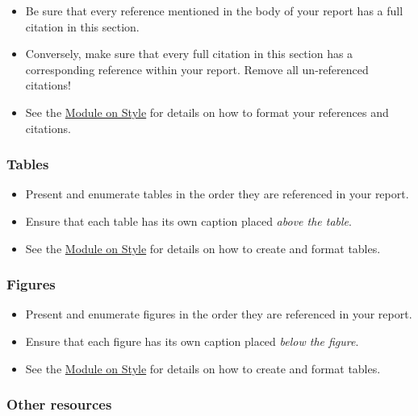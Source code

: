 \documentclass[
]{book}
\begin{document}
\begin{itemize}
\item
  Be sure that every reference mentioned in the body of your report has a full citation in this section.
\item
  Conversely, make sure that every full citation in this section has a corresponding reference within your report. Remove all un-referenced citations!
\item
  See the \protect\hyperlink{style}{Module on Style} for details on how to format your references and citations.
\end{itemize}

\hypertarget{tables-1}{%
\subsubsection*{Tables}\label{tables-1}}

\begin{itemize}
\item
  Present and enumerate tables in the order they are referenced in your report.
\item
  Ensure that each table has its own caption placed \emph{above the table}.
\item
  See the \protect\hyperlink{style}{Module on Style} for details on how to create and format tables.
\end{itemize}

\hypertarget{figures-1}{%
\subsubsection*{Figures}\label{figures-1}}

\begin{itemize}
\item
  Present and enumerate figures in the order they are referenced in your report.
\item
  Ensure that each figure has its own caption placed \emph{below the figure}.
\item
  See the \protect\hyperlink{style}{Module on Style} for details on how to create and format tables.
\end{itemize}

\hypertarget{other-resources-3}{%
\subsubsection*{Other resources}\label{other-resources-3}}
\end{document}

